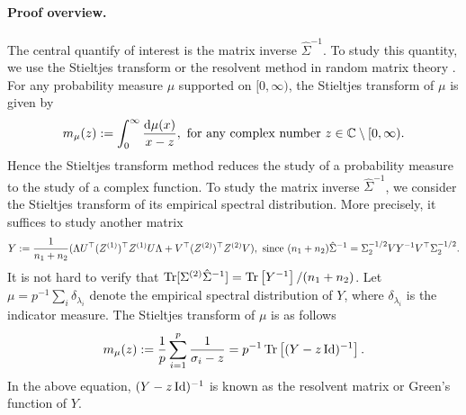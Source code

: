 \paragraph{Proof overview.} The central quantify of interest is the matrix inverse $\hat{\Sigma}^{-1}$.
To study this quantity, we use the Stieltjes transform or the resolvent method in random matrix theory \cite{bai2009spectral,tao2012topics,erdos2017dynamical}.
For any probability measure $\mu$ supported on $[0,\infty)$, the Stieltjes transform of $\mu$ is given by
$$m_\mu(z):= \int_0^\infty \frac{\mathrm{d}\mu(x)}{x-z}, \text{ for any complex number } z\in \mathbb{C}\setminus [0,\infty).$$
Hence the Stieltjes transform method reduces the study of a probability measure to the study of a complex function.
To study the matrix inverse $\hat{\Sigma}^{-1}$, we consider the Stieltjes transform of its empirical spectral distribution.
More precisely, it suffices to study another matrix
\begin{align}\label{eigen2extra}
	Y := \frac{1}{n_1 + n_2}(\Lambda U^\top (Z^{(1)})^\top Z^{(1)} U\Lambda  + V^\top (Z^{(2)})^\top Z^{(2)}V), \text{ since } (n_1 + n_2)\hat{\Sigma}^{-1}= \Sigma_2^{-1/2} VY^{-1}V^\top \Sigma_2^{-1/2}.
\end{align}
It is not hard to verify that $\operatorname{Tr}[\Sigma^{(2)} \hat{\Sigma}^{-1}] = \operatorname{Tr}\left[Y^{-1}\right] / (n_1 + n_2)$.
Let $\mu=p^{-1}\sum_{i} \delta_{\lambda_i}$ denote the empirical spectral distribution of $Y$, where $\delta_{\lambda_i}$ is the indicator measure.
The Stieltjes transform of $\mu$ is as follows
 \[ m_{\mu}(z) := \frac{1}{p}\sum_{i=1}^p \frac{1}{\sigma_i - z}= p^{-1}\operatorname{Tr}\left[(Y-z\operatorname{Id})^{-1}\right]. \]
In the above equation, $(Y - z\operatorname{Id})^{-1}$ is known as the resolvent matrix or Green's function of $Y$.
